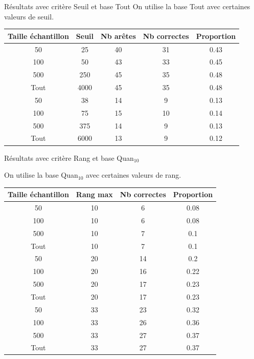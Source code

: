 \documentclass{beamer}
\begin{document}
\begin{frame}{Résultats avec critère Seuil et base Tout}
On utilise la base Tout avec certaines valeurs de seuil.
\begin{tabular}{|c|c|c|c|c|}
   \hline
   Taille échantillon & Seuil & Nb arêtes & Nb correctes & Proportion\\
   \hline
   50 & 25 & 40 & 31 & 0.43  \\
   \hline
   100 & 50 & 43 & 33 & 0.45  \\
   \hline
   500 & 250 & 45 & 35 & 0.48  \\
   \hline
   Tout & 4000 & 45 & 35 & 0.48 \\
   \hline
   50 & 38 & 14 & 9 & 0.13  \\
   \hline
   100 & 75 & 15 & 10 & 0.14  \\
   \hline
   500 & 375 & 14 & 9 & 0.13  \\
   \hline
   Tout & 6000 & 13 & 9 & 0.12 \\
\end{tabular}
\end{frame}


\begin{frame}{Résultats avec critère Rang et base Quan$_{10}$}

On utilise la base Quan$_{10}$ avec certaines valeurs de rang.
\begin{tabular}{|c|c|c|c|}
   \hline
   Taille échantillon & Rang max & Nb correctes & Proportion\\
   \hline
   50 & 10  & 6 & 0.08  \\
   \hline
   100 & 10  & 6 & 0.08  \\
   \hline
   500 & 10  & 7 & 0.1  \\
   \hline
   Tout & 10 & 7 & 0.1 \\
   \hline
   50 & 20 & 14 & 0.2  \\
   \hline
   100 & 20 & 16 & 0.22  \\
   \hline
   500 & 20 & 17 & 0.23  \\
   \hline
   Tout & 20 & 17 & 0.23 \\
   \hline
   50 & 33 & 23 & 0.32  \\
   \hline
   100 & 33 & 26 & 0.36  \\
   \hline
   500 & 33 & 27 & 0.37  \\
   \hline
   Tout & 33 & 27 & 0.37 \\
\end{tabular}

\end{frame}
\end{document}
